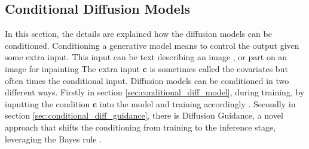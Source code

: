 \subsection{Conditional Diffusion Models} \label{sec:conditional_diff}
In this section, the details are explained how the diffusion models can be conditioned. Conditioning a generative model means to control the output given some extra input. This input can be text describing an image \cite{rombach_high-resolution_2022}, or part on an image for inpainting \cite{rombach_high-resolution_2022} The extra input $\mathbf{c}$ is sometimes called the covariates but often times the conditional input. Diffusion models can be conditioned in two different ways. Firstly in section \ref{sec:conditional_diff_model}, during training, by inputting the condition $\mathbf{c}$ into the model and training accordingly \cite{ho_cascaded_2021}. Secondly in section \ref{sec:conditional_diff_guidance}, there is Diffusion Guidance, a novel approach that shifts the conditioning from training to the inference stage, leveraging the Bayes rule \cite{song_score-based_2021}. 


